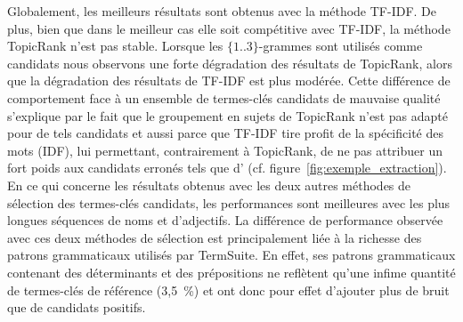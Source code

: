     Globalement, les meilleurs résultats sont obtenus avec la méthode TF-IDF. De
    plus, bien que dans le meilleur cas elle soit compétitive avec TF-IDF, la
    méthode TopicRank n'est pas stable. Lorsque les $\{1..3\}$-grammes
    sont utilisés comme candidats nous observons une forte dégradation des
    résultats de TopicRank, alors que la dégradation des résultats de TF-IDF est
    plus modérée. Cette différence de comportement face à un ensemble de
    termes-clés candidats de mauvaise qualité s'explique par le fait que le
    groupement en sujets de TopicRank n'est pas adapté pour de tels candidats et
    aussi parce que TF-IDF tire profit de la spécificité des mots (IDF), lui
    permettant, contrairement à TopicRank, de ne pas attribuer un fort poids aux
    candidats erronés tels que \og{}d'\fg{} (cf.
    figure~\ref{fig:exemple_extraction}). En ce qui concerne les résultats
    obtenus avec les deux autres méthodes de sélection des termes-clés
    candidats, les performances sont meilleures avec les plus longues séquences
    de noms et d'adjectifs. La différence de performance observée avec ces deux
    méthodes de sélection est principalement liée à la richesse des patrons
    grammaticaux utilisés par TermSuite. En effet, ses patrons grammaticaux
    contenant des déterminants et des prépositions ne reflètent qu'une infime
    quantité de termes-clés de référence (3,5~\%) et ont donc pour effet
    d'ajouter plus de bruit que de candidats positifs.
